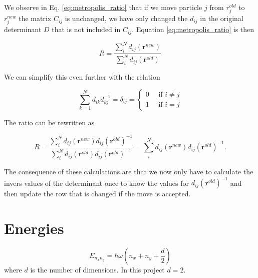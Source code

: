 
We observe in Eq. \ref{eq:metropolis_ratio} that if we move particle $j$ from $r_j^{old}$ to $r_j^{new}$ the matrix $C_{ij}$ is unchanged, we have only changed the $d_{ij}$ in the original determinant $D$ that is not included in $C_{ij}$. Equation \ref{eq:metropolis_ratio} is then

\begin{equation}
R = \frac{\sum_i^N d_{ij}(\bm{r}^{new})}{\sum_i^N d_{ij}(\bm{r}^{old})}
\end{equation}

We can simplify this even further with the relation

\begin{equation}
\sum_{k=1}^N d_{ik}^{}d_{kj}^{-1} = \delta_{ij} = \left\{ \begin{matrix}
0 \quad \text{ if } i \neq j \\
1 \quad \text{ if } i = j
\end{matrix} \right. 
\end{equation}

The ratio can be rewritten as

\begin{equation}
R = \frac{\sum_i^N d_{ij}(\bm{r}^{new})d_{ij}(\bm{r}^{old})^{-1}}{\sum_i^N d_{ij}(\bm{r}^{old})d_{ij}(\bm{r}^{old})^{-1}} = \sum_i^N d_{ij}(\bm{r}^{new})d_{ij}(\bm{r}^{old})^{-1}.
\end{equation}

The consequence of these calculations are that we now only have to calculate the invers values of the determinant once to know the values for $d_{ij}(\bm{r}^{old})^{-1}$ and then update the row that is changed if the move is accepted.

\section{Energies}

\begin{equation}
E_{n_xn_y} = \hbar \omega (n_x + n_y + \frac{d}{2})
\end{equation} where $d$ is the number of dimensions. In this project $d=2$.

